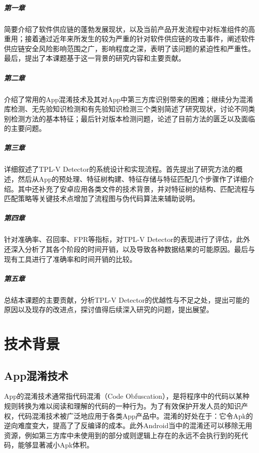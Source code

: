 \paragraph{第一章}简要介绍了软件供应链的蓬勃发展现状，以及当前产品开发流程中对标准组件的高重用；接着通过近年来所发生的较为严重的针对软件供应链的攻击事件，阐述软件供应链安全风险影响范围之广，影响程度之深，表明了该问题的紧迫性和严重性。最后，提出了本课题基于这一背景的研究内容和主要贡献。
\paragraph{第二章}介绍了常用的App混淆技术及其对App中第三方库识别带来的困难；继续分为混淆库检测、无先验知识检测和有先验知识检测三个类别简述了研究现状，讨论不同类别检测方法的基本特征；最后针对版本检测问题，论述了目前方法的匮乏以及面临的主要问题。
\paragraph{第三章}详细叙述了TPL-V Detector的系统设计和实现流程。首先提出了研究方法的概述，然后从App的预处理、特征树构建、特征存储与特征匹配几个步骤作了详细介绍。其中还补充了安卓应用各类文件的技术背景，并对特征树的结构、匹配流程与匹配策略等关键技术点增加了流程图与伪代码算法来辅助说明。
\paragraph{第四章}针对准确率、召回率、FPR等指标，对TPL-V Detector的表现进行了评估，此外还深入分析了其各个阶段的时间开销，以及导致各种数据结果的可能原因。最后与现有工具进行了准确率和时间开销的比较。
\paragraph{第五章}总结本课题的主要贡献，分析TPL-V Detector的优越性与不足之处，提出可能的原因以及现存的改进点，探讨值得后续深入研究的问题，提出展望。


\chapter{技术背景}

\section{App混淆技术}
App的混淆技术通常指代码混淆（Code Obfuscation），是将程序中的代码以某种规则转换为难以阅读和理解的代码的一种行为。为了有效保护开发人员的知识产权，代码混淆技术被广泛地应用于各类App产品中。混淆的好处在于：它令Apk的逆向难度变大，提高了了反编译的成本。此外Android当中的混淆还可以移除无用资源，例如第三方库中未使用到的部分或则逻辑上存在的永远不会执行到的死代码，能够显著减小Apk体积\cite{dong2018understanding}。

